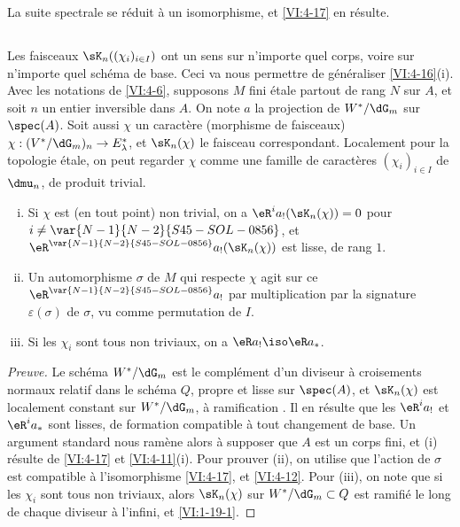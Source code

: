 La suite spectrale se réduit à un isomorphisme, et \ref{VI:4-17} en 
résulte. 





\subsection{}\label{VI:4-19}

Les faisceaux $\sK_n((\chi_i)_{i\in I})$ ont un sens sur n'importe quel corps, 
voire sur n'importe quel schéma de base. Ceci va nous permettre de généraliser 
\ref{VI:4-16}(i). Avec les notations de \ref{VI:4-6}, supposons $M$ fini 
étale partout de rang $N$ sur $A$, et soit $n$ un entier inversible dans $A$. 
On note $a$ la projection de $W^\ast/\dG_m$ sur $\spec(A)$. Soit aussi $\chi$ 
un caractère (morphisme de faisceaux) 
$\chi:(V^\ast/\dG_m)_n \to E_\lambda^\ast$, et $\sK_n(\chi)$ le faisceau 
correspondant. Localement pour la topologie étale, on peut regarder $\chi$ 
comme une famille de caractères $(\chi_i)_{i\in I}$ de $\dmu_n$, de produit 
trivial. 





\begin{proposition_}\label{VI:4-20}
\begin{enumerate}[(i)]
  \item Si $\chi$ est (en tout point) non trivial, on a 
    $\eR^i a_! (\sK_n(\chi)) = 0$ pour $i\ne \var{N-1}{N-2}{S45-SOL-0856}$, et 
    $\eR^{\var{N-1}{N-2}{S45-SOL-0856}} a_!(\sK_n(\chi))$ est lisse, de rang $1$. 
  \item Un automorphisme $\sigma$ de $M$ qui respecte $\chi$ agit sur ce 
    $\eR^{\var{N-1}{N-2}{S45-SOL-0856}} a_!$ par multiplication par la signature $\varepsilon(\sigma)$ 
    de $\sigma$, vu comme permutation de $I$. 
  \item Si les $\chi_i$ sont tous non triviaux, on a $\eR a_! \iso \eR a_\ast$. 
\end{enumerate}
\end{proposition_}
\begin{proof}[Preuve]
Le schéma $W^\ast/\dG_m$ est le complément d'un diviseur à croisements 
normaux relatif dans le schéma $Q$, propre et lisse sur $\spec(A)$, et 
$\sK_n(\chi)$ est 
localement constant sur $W^\ast/\dG_m$, à ramification 
. Il en résulte que les $\eR^i a_!$ et 
$\eR^i a_\ast$ sont lisses, de formation compatible à tout changement de 
base. Un argument standard nous ramène alors à supposer que $A$ est un 
corps fini, et (i) résulte de \ref{VI:4-17} et \ref{VI:4-11}(i). Pour 
prouver (ii), on utilise que l'action de $\sigma$ est compatible à 
l'isomorphisme \ref{VI:4-17}, et \ref{VI:4-12}. Pour (iii), on note que si les 
$\chi_i$ sont tous non triviaux, alors $\sK_n(\chi)$ sur 
$W^\ast/\dG_m\subset Q$ est ramifié le long de chaque diviseur à l'infini, 
et \ref{VI:1-19-1}. 
\end{proof}










